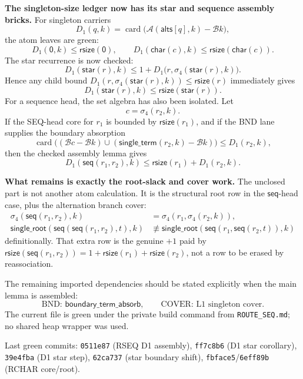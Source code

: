 \documentclass[11pt]{article}
\newcommand{\A}{\mathcal A}
\newcommand{\B}{\mathcal B}
\newcommand{\sr}{\mathsf{single\_root}}
\newcommand{\st}{\mathsf{single\_term}}
\newcommand{\s}{\sigma_4}
\newcommand{\rsize}{\mathsf{rsize}}
\newcommand{\D}{D_1}
\newcommand{\RZERO}{\mathsf{0}}
\newcommand{\RCHAR}{\mathsf{char}}
\newcommand{\RSEQ}{\mathsf{seq}}
\newcommand{\RALTS}{\mathsf{alts}}
\newcommand{\RSTAR}{\mathsf{star}}
\begin{document}
\textbf{The singleton-size ledger now has its star and sequence assembly bricks.}
For singleton carriers
\[
  \D(q,k)=\operatorname{card}\big(\A(\RALTS[q],k)-\B k\big),
\]
the atom leaves are green:
\[
  \D(\RZERO,k)\le \rsize(\RZERO),
  \qquad
  \D(\RCHAR(c),k)\le \rsize(\RCHAR(c)).
\]
The star recurrence is now checked:
\[
  \D(\RSTAR(r),k)
  \le
  1+\D\big(r,\s(\RSTAR(r),k)\big).                                \tag{D1-STAR}
\]
Hence any child bound
\(\D(r,\s(\RSTAR(r),k))\le \rsize(r)\)
immediately gives
\[
  \D(\RSTAR(r),k)\le \rsize(\RSTAR(r)).
\]
For a sequence head, the set algebra has also been isolated.  Let
\[
  c=\s(r_2,k).
\]
If the SEQ-head core for \(r_1\) is bounded by \(\rsize(r_1)\), and if the BND
lane supplies the boundary absorption
\[
  \operatorname{card}\big((\B c-\B k)\cup(\st(r_2,k)-\B k)\big)
  \le \D(r_2,k),
\]
then the checked assembly lemma gives
\[
  \D(\RSEQ(r_1,r_2),k)\le \rsize(r_1)+\D(r_2,k).                  \tag{D1-SEQ}
\]

\textbf{What remains is exactly the root-slack and cover work.}
The unclosed part is not another atom calculation.  It is the structural
root row in the \(\RSEQ\)-head case, plus the alternation branch cover:
\[
  \begin{aligned}
  \s(\RSEQ(r_1,r_2),k)&=\s(r_1,\s(r_2,k)),\\
  \sr(\RSEQ(\RSEQ(r_1,r_2),t),k)
  &\not\equiv
  \sr(\RSEQ(r_1,\RSEQ(r_2,t)),k)
  \end{aligned}
\]
definitionally.  That extra row is the genuine \(+1\) paid by
\(\rsize(\RSEQ(r_1,r_2))=1+\rsize(r_1)+\rsize(r_2)\), not a row to be erased
by reassociation.

The remaining imported dependencies should be stated explicitly when the main
lemma is assembled:
\[
  \text{BND: }\mathsf{boundary\_term\_absorb},
  \qquad
  \text{COVER: L1 singleton cover}.
\]
The current file is green under the private build command from
\texttt{ROUTE\_SEQ.md}; no shared heap wrapper was used.

\vfill
{\footnotesize
Last green commits: \texttt{0511e87} (RSEQ D1 assembly),
\texttt{ff7c8b6} (D1 star corollary),
\texttt{39e4fba} (D1 star step),
\texttt{62ca737} (star boundary shift),
\texttt{fbface5}/\texttt{6eff89b} (RCHAR core/root).
}
\end{document}
